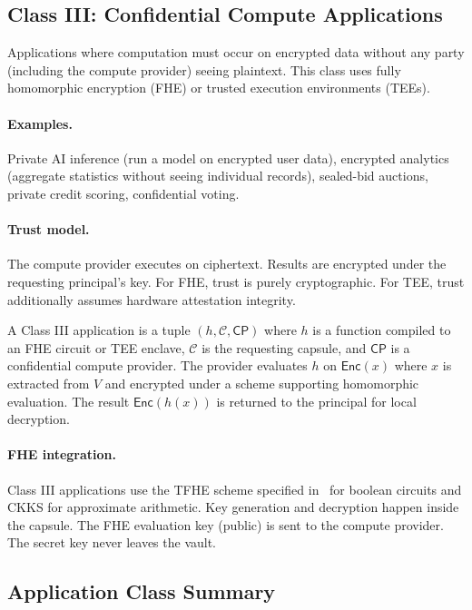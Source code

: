 \subsection{Class III: Confidential Compute Applications}\label{sec:class3}

Applications where computation must occur on encrypted data without any party
(including the compute provider) seeing plaintext. This class uses fully
homomorphic encryption (FHE) or trusted execution environments (TEEs).

\paragraph{Examples.} Private AI inference (run a model on encrypted user data),
encrypted analytics (aggregate statistics without seeing individual records),
sealed-bid auctions, private credit scoring, confidential voting.

\paragraph{Trust model.} The compute provider executes on ciphertext. Results
are encrypted under the requesting principal's key. For FHE, trust is purely
cryptographic. For TEE, trust additionally assumes hardware attestation
integrity.

\begin{definition}\label{def:class3}
A Class III application is a tuple $(h, \mathcal{C}, \mathsf{CP})$ where
$h$ is a function compiled to an FHE circuit or TEE enclave, $\mathcal{C}$ is
the requesting capsule, and $\mathsf{CP}$ is a confidential compute provider.
The provider evaluates $h$ on $\mathsf{Enc}(x)$ where $x$ is extracted from $V$
and encrypted under a scheme supporting homomorphic evaluation. The result
$\mathsf{Enc}(h(x))$ is returned to the principal for local decryption.
\end{definition}

\paragraph{FHE integration.} Class III applications use the TFHE scheme specified
in~\cite{lux-tfhe} for boolean circuits and CKKS for approximate arithmetic.
Key generation and decryption happen inside the capsule. The FHE evaluation key
(public) is sent to the compute provider. The secret key never leaves the vault.

\subsection{Application Class Summary}


